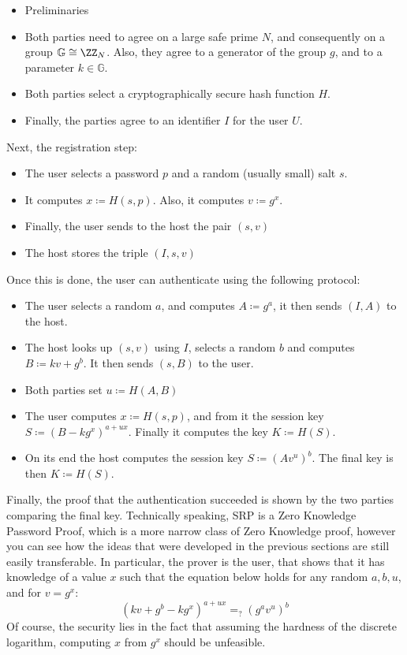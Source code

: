 \documentclass{article}
\begin{document}
\begin{itemize}
    \item Preliminaries
    \item Both parties need to agree on a large safe prime $N$, and consequently on a group $\mathbb{G} \cong \ZZ_N$.
          Also, they agree to a generator of the group $g$, and to a parameter $k \in \mathbb{G}$.
    \item Both parties select a cryptographically secure hash function $H$.
    \item Finally, the parties agree to an identifier $I$ for the user $U$.
\end{itemize}
Next, the registration step:
\begin{itemize}
    \item The user selects a password $p$ and a random (usually small) salt $s$.
    \item It computes $x \coloneqq H(s, p)$. Also, it computes $v \coloneqq g^x$.
    \item Finally, the user sends to the host the pair $(s, v)$
    \item The host stores the triple $(I, s, v)$
\end{itemize}
Once this is done, the user can authenticate using the following protocol:
\begin{itemize}
    \item The user selects a random $a$, and computes $A \coloneqq g^a$, it then sends $(I, A)$ to the host.
    \item The host looks up $(s,v)$ using $I$, selects a random $b$ and computes $B \coloneqq kv + g^b$. It then sends $(s, B)$ to the user.
    \item Both parties set $u \coloneqq H(A, B)$
    \item The user computes $x \coloneqq H(s, p)$, and from it the session key $S \coloneqq (B - kg^x)^{a + ux}$. Finally it computes the key
          $K \coloneqq H(S)$.
    \item On its end the host computes the session key $S \coloneqq (Av^u)^b$. The final key is then $K \coloneqq H(S)$.
\end{itemize}
Finally, the proof that the authentication succeeded is shown by the two parties comparing the final key.
Technically speaking, SRP is a Zero Knowledge Password Proof, which is a more narrow class of Zero Knowledge proof,
however you can see how the ideas that were developed in the previous sections are still easily transferable.
In particular, the prover is the user, that shows that it has knowledge of a value $x$ such that the equation
below holds for any random $a, b, u$, and for $v = g^x$:
\[ (kv + g^b - kg^x)^{a + ux} =_? (g^a v^u)^b \]
Of course, the security lies in the fact that assuming the hardness of the discrete logarithm, computing
$x$ from $g^x$ should be unfeasible.
\end{document}
